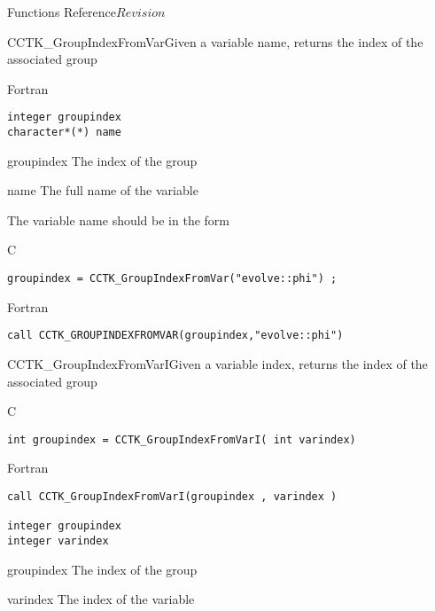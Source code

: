 \begin{cactuspart}{ Functions Reference}{}{$Revision$}
\begin{FunctionDescription}{CCTK\_GroupIndexFromVar}{Given a variable name, returns the index of the associated group}
\begin{SynopsisSection}
\begin{Synopsis}{Fortran}
\begin{verbatim}
integer groupindex
character*(*) name \end{verbatim}
\end{Synopsis}
\end{SynopsisSection}
\begin{ParameterSection}
\begin{Parameter}{groupindex}
The index of the group
\end{Parameter}
\begin{Parameter}{name}
The full name of the variable
\end{Parameter}
\end{ParameterSection}
\begin{Discussion}
The variable name should be in the form 
\end{Discussion}
\begin{ExampleSection}
\begin{Example}{C}
\begin{verbatim}
groupindex = CCTK_GroupIndexFromVar("evolve::phi") ;
\end{verbatim}
\end{Example}
\begin{Example}{Fortran}
\begin{verbatim}
call CCTK_GROUPINDEXFROMVAR(groupindex,"evolve::phi")
\end{verbatim}
\end{Example}
\end{ExampleSection}
\end{FunctionDescription}


\begin{FunctionDescription}{CCTK\_GroupIndexFromVarI}{Given a variable index, returns the index of the associated group}
\label{CCTK-GroupIndexFromVarI}
\begin{SynopsisSection}
\begin{Synopsis}{C}
\begin{verbatim}int groupindex = CCTK_GroupIndexFromVarI( int varindex)\end{verbatim}
\end{Synopsis}
\begin{Synopsis}{Fortran}
\begin{verbatim}call CCTK_GroupIndexFromVarI(groupindex , varindex )

integer groupindex
integer varindex \end{verbatim}
\end{Synopsis}
\end{SynopsisSection}
\begin{ParameterSection}
\begin{Parameter}{groupindex}
The index of the group
\end{Parameter}
\begin{Parameter}{varindex}
The index of the variable
\end{Parameter}
\end{ParameterSection}


\end{FunctionDescription}
\end{cactuspart}
